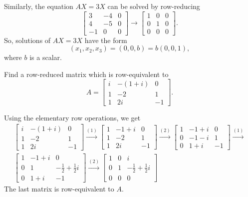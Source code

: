 \begin{solution}
  Similarly, the equation $AX = 3X$ can be solved by row-reducing
  \begin{equation*}
    \begin{bmatrix}
      3 & -4 & 0 \\
      4 & -5 & 0 \\
      -1 & 0 & 0
    \end{bmatrix}
    \rightarrow
    \begin{bmatrix}
      1 & 0 & 0 \\
      0 & 1 & 0 \\
      0 & 0 & 0
    \end{bmatrix}.
  \end{equation*}
  So, solutions of $AX = 3X$ have the form
  \begin{equation*}
    (x_1,x_2,x_3) = (0,0,b) = b(0,0,1),
  \end{equation*}
  where $b$ is a scalar.
\end{solution}

 Find a row-reduced matrix which is row-equivalent to
\begin{equation*}
  A =
  \begin{bmatrix}
    i & -(1 + i) & 0 \\
    1 & -2 & 1 \\
    1 & 2i & -1
  \end{bmatrix}.
\end{equation*}
\begin{solution}
  Using the elementary row operations, we get
  \begin{gather*}
    \begin{bmatrix}
      i & -(1 + i) & 0 \\
      1 & -2 & 1 \\
      1 & 2i & -1
    \end{bmatrix}
    \xrightarrow{(1)}
    \begin{bmatrix}
      1 & -1 + i & 0 \\
      1 & -2 & 1 \\
      1 & 2i & -1
    \end{bmatrix}
    \xrightarrow{(2)}
    \begin{bmatrix}
      1 & -1 + i & 0 \\
      0 & -1 - i & 1 \\
      0 & 1+i & -1
    \end{bmatrix}
    \xrightarrow{(1)} \\
    \begin{bmatrix}
      1 & -1 + i & 0 \\[3pt]
      0 & 1 & -\frac12 + \frac12i \\[3pt]
      0 & 1+i & -1
    \end{bmatrix}
    \xrightarrow{(2)}
    \begin{bmatrix}
      1 & 0 & i \\[3pt]
      0 & 1 & -\frac12 + \frac12i \\[3pt]
      0 & 0 & 0
    \end{bmatrix}
  \end{gather*}
  The last matrix is row-equivalent to $A$.
\end{solution}

